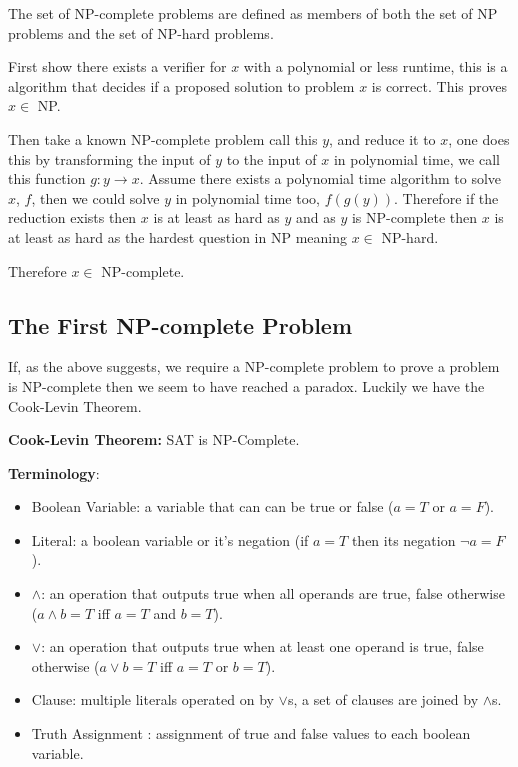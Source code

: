 \documentclass[a4paper,11pt]{report}
\newcounter{row}
\begin{document}
The set of NP-complete problems are defined as members of both the set of NP problems and the set of NP-hard problems. 

First show there exists a verifier for $x$ with a polynomial or less runtime, this is a algorithm that decides if a proposed solution to problem $x$ is correct. This proves $x\in$ NP.

Then take a known NP-complete problem call this $y$, and reduce it to $x$, one does this by transforming the input of $y$ to the input of $x$ in polynomial time, we call this function $g: y\rightarrow x$. Assume there exists a polynomial time algorithm to solve $x$, $f$, then we could solve $y$ in polynomial time too, $f(g(y))$. Therefore if the reduction exists then $x$ is at least as hard as $y$ and as $y$ is NP-complete then $x$ is at least as hard as the hardest question in NP meaning $x \in$ NP-hard.

Therefore $x\in $ NP-complete.

\subsection{The First NP-complete Problem} 

If, as the above suggests, we require a NP-complete problem to prove a problem is NP-complete then we seem to have reached a paradox. Luckily we have the Cook-Levin Theorem.

\textbf{Cook-Levin Theorem:} SAT is NP-Complete. \cite{compcomplexityamodernapproach}

\textbf{Terminology}:
\begin{itemize}
\item Boolean Variable: a variable that can can be true or false ($a=T$ or $a=F$).
\item Literal: a boolean variable or it's negation (if $a = T$ then its negation $\neg a = F$).
\item $\land$: an operation that outputs true when all operands are true, false otherwise ($a\land b = T$ iff $a=T$ and $b=T$).
\item $\lor$: an operation that outputs true when at least one operand is true, false otherwise ($a\lor b = T$ iff $a=T$ or $b=T$).
\item Clause: multiple literals operated on by $\lor$s, a set of clauses are joined by $\land$s.
\item Truth Assignment : assignment of true and false values to each boolean variable. 
\end{itemize}
\end{document}
